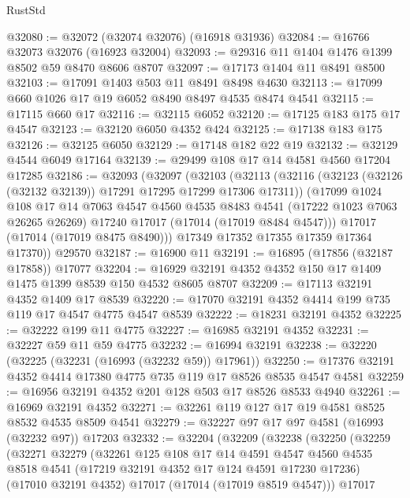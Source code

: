 \begin{lexlean}{RustStd}
\begin{coremodule}
{\begin{coremodule}
{{{{{{{{{{{{{{{{{{{{{{{{{{{{{{{{{{{{{{{{{{{{{{{{{{{{{{{@32080 := @32072 (@32074 @32076) (@16918 @31936)
@32084 := @16766 @32073 @32076 (@16923 @32004)
@32093 := @29316 @11 @1404 @1476 @1399 @8502 @59 @8470 @8606 @8707
@32097 := @17173 @1404 @11 @8491 @8500
@32103 := @17091 @1403 @503 @11 @8491 @8498 @4630
@32113 := @17099 @660 @1026 @17 @19 @6052 @8490 @8497 @4535 @8474 @4541
@32115 := @17115 @660 @17
@32116 := @32115 @6052
@32120 := @17125 @183 @175 @17 @4547
@32123 := @32120 @6050 @4352 @424
@32125 := @17138 @183 @175
@32126 := @32125 @6050
@32129 := @17148 @182 @22 @19
@32132 := @32129 @4544 @6049 @17164
@32139 := @29499 @108 @17 @14 @4581 @4560 @17204 @17285
@32186 := @32093
    (@32097
      (@32103
        (@32113
          (@32116 (@32123 (@32126 (@32132 @32139)) @17291 @17295 @17299 @17306 @17311))
          (@17099
            @1024
            @108
            @17
            @14
            @7063
            @4547
            @4560
            @4535
            @8483
            @4541
            (@17222 @1023 @7063 @26265 @26269)
            @17240
            @17017
            (@17014 (@17019 @8484 @4547)))
          @17017
          (@17014 (@17019 @8475 @8490)))
        @17349
        @17352
        @17355
        @17359
        @17364
        @17370))
    @29570
@32187 := @16900 @11
@32191 := @16895 (@17856 (@32187 @17858)) @17077
@32204 := @16929 @32191 @4352 @4352 @150 @17 @1409 @1475 @1399 @8539 @150 @4532 @8605 @8707
@32209 := @17113 @32191 @4352 @1409 @17 @8539
@32220 := @17070 @32191 @4352 @4414 @199 @735 @119 @17 @4547 @4775 @4547 @8539
@32222 := @18231 @32191 @4352
@32225 := @32222 @199 @11 @4775
@32227 := @16985 @32191 @4352
@32231 := @32227 @59 @11 @59 @4775
@32232 := @16994 @32191
@32238 := @32220 (@32225 (@32231 (@16993 (@32232 @59)) @17961))
@32250 := @17376 @32191 @4352 @4414 @17380 @4775 @735 @119 @17 @8526 @8535 @4547 @4581
@32259 := @16956 @32191 @4352 @201 @128 @503 @17 @8526 @8533 @4940
@32261 := @16969 @32191 @4352
@32271 := @32261 @119 @127 @17 @19 @4581 @8525 @8532 @4535 @8509 @4541
@32279 := @32227 @97 @17 @97 @4581 (@16993 (@32232 @97)) @17203
@32332 := @32204
    (@32209
      (@32238
        (@32250
          (@32259
            (@32271
              @32279
              (@32261
                @125
                @108
                @17
                @14
                @4591
                @4547
                @4560
                @4535
                @8518
                @4541
                (@17219 @32191 @4352 @17 @124 @4591 @17230 @17236)
                (@17010 @32191 @4352)
                @17017
                (@17014 (@17019 @8519 @4547)))
              @17017
}}}}}}}}}}}}}}}}}}}}}}}}}}}}}}}}}}}}}}}}}}}}}}}}}}}}}}}
\end{coremodule}}
\end{coremodule}
\end{lexlean}
